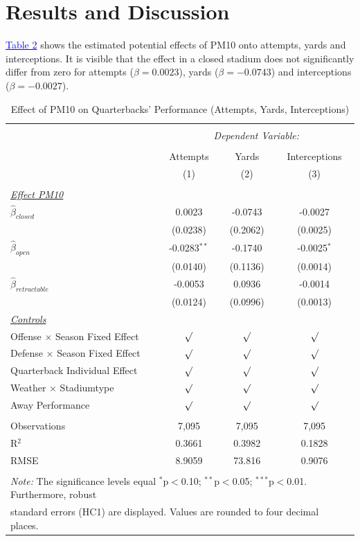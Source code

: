 \documentclass[12pt,a4paper]{article}
\newcommand{\mylink}[2]{\hyperref[#1]{\textcolor{blue}{#2}}}
\begin{document}
{\clearpage \section{Results and Discussion}
\label{5}
\mylink{T2}{Table 2} shows the estimated potential effects of PM10 onto attempts, yards and interceptions. It is visible that the effect in a closed stadium does not significantly differ from zero for attempts ($\beta = 0.0023$), yards ($\beta = -0.0743$) and interceptions ($\beta = -0.0027$). 
\begin{table}[!htbp] \centering 
  \caption{Effect of PM10 on Quarterbacks' Performance (Attempts, Yards, Interceptions)} 
  \label{T2} 
\begin{tabular}{@{\extracolsep{5pt}}lccc} 
\\[-1.8ex]\hline 
\hline \\[-1.8ex] 
 & \multicolumn{3}{c}{\textit{Dependent Variable:}} \\ \cline{2-4} \\ [-1.8ex]
 & Attempts & Yards & Interceptions \\ 
  & (1) & (2) & (3)\\ \hline \\[-1.8ex] 
 \underline{\textit{Effect PM10}}\\[0.4cm]
  $\hat{\beta}_{closed}$& 0.0023 & -0.0743 & -0.0027 \\ 
  & (0.0238)  & (0.2062)& (0.0025) \\[0.4cm]
  $\hat{\beta}_{open}$& -0.0283$^{**}$ & -0.1740 & -0.0025$^{*}$\\ 
  & (0.0140) & (0.1136) & (0.0014) \\[0.4cm]
  $\hat{\beta}_{retractable}$& -0.0053 & 0.0936 & -0.0014 \\ 
  & (0.0124) & (0.0996) & (0.0013)\\ [0.4cm]
  \underline{\textit{Controls}} \\[0.4cm]
  Offense $\times$ Season Fixed Effect & $\surd$ & $\surd$ & $\surd$ \\[0.4cm]
   Defense $\times$ Season Fixed Effect & $\surd$ & $\surd$  & $\surd$ \\[0.4cm]
    Quarterback Individual Effect & $\surd$ & $\surd$ & $\surd$  \\[0.4cm]
    Weather $\times $ Stadiumtype & $\surd$ & $\surd$ & $\surd$ \\[0.4cm]
    Away Performance & $\surd$ & $\surd$ & $\surd$\\
\hline \\[-1.8ex] 
Observations & 7,095 & 7,095 & 7,095 \\ 
R$^{2}$ & 0.3661 &  0.3982 & 0.1828\\ 
RMSE & 8.9059 & 73.816 & 0.9076\\ \hline 
\hline \\[-1.8ex] 
\multicolumn{4}{l}{\footnotesize \textit{Note:} The significance levels equal {$^{*}$p$<$0.10; $^{**}$p$<$0.05; $^{***}$p$<$0.01}.  Furthermore, robust} \\ \multicolumn{4}{l}{\footnotesize standard errors (HC1) are displayed. Values are rounded to four decimal places.}
  \end{tabular}
\end{table} 

}
\end{document}
